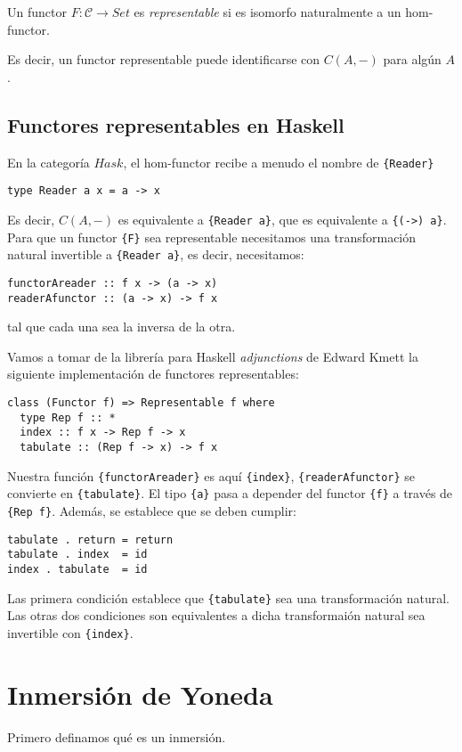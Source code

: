 \documentclass[12pt, twoside]{book}
\newcommand{\newterm}[1]{\index{#1}\emph{#1}}
\newcommand{\code}[1]{\Verb+{#1}+}
\newcommand{\cat}{{\mathcal{C}}}
\newcommand{\Set}{{Set}}
\newcommand{\Hask}{{Hask}}
\begin{document}
\begin{definition}
Un functor $F \colon \cat \to \Set$ es \newterm{representable} si es isomorfo naturalmente a un hom-functor.
\end{definition}

Es decir, un functor representable puede identificarse con $C(A,-)$ para algún $A$.

\subsection{Functores representables en Haskell}
En la categoría $\Hask$, el hom-functor recibe a menudo el nombre de \code{Reader}
\begin{verbatim}
type Reader a x = a -> x
\end{verbatim}
Es decir, $C(A,-)$ es equivalente a \code{Reader a}, que es equivalente a \code{(->) a}.
Para que un functor \code{F} sea representable necesitamos una transformación natural invertible a \code{Reader a}, es decir, necesitamos:
\begin{verbatim}
functorAreader :: f x -> (a -> x)
readerAfunctor :: (a -> x) -> f x
\end{verbatim}
tal que cada una sea la inversa de la otra.

Vamos a tomar de la librería para Haskell \textit{adjunctions} de Edward Kmett la siguiente implementación de functores representables:
\begin{verbatim}
class (Functor f) => Representable f where
  type Rep f :: *
  index :: f x -> Rep f -> x
  tabulate :: (Rep f -> x) -> f x
\end{verbatim}
Nuestra función \code{functorAreader} es aquí \code{index}, \code{readerAfunctor} se convierte en \code{tabulate}.
El tipo \code{a} pasa a depender del functor \code{f} a través de \code{Rep f}.
Además, se establece que se deben cumplir:
\begin{verbatim}
tabulate . return = return
tabulate . index  = id
index . tabulate  = id
\end{verbatim}
Las primera condición establece que \code{tabulate} sea una transformación natural. 
Las otras dos condiciones son equivalentes a dicha transformaión natural sea invertible con \code{index}.

\section{Inmersión de Yoneda}
Primero definamos qué es un inmersión.
\end{document}
